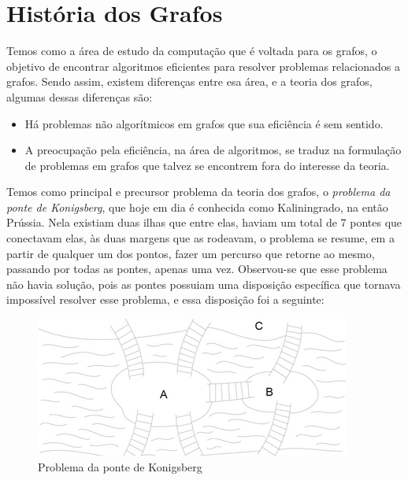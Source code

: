 \documentclass[12pt a4paper]{paper}
\title{\center{Teoria dos Grafos}}
\author{João Vitor Rezende Moura}
\date{2023-10-29}
\begin{document}
\maketitle
\begin{abstract}
Algoritmos e Grafos são de suma importância dentro do campo computacional devido à importância do seu uso, tanto no campo teórico, como no prático. Devido o seu foco computacional, a eficiência de tempo e espaço dos processos são fundamentais devido à sua aplicação posterior dentro da computação.
É de importância, o estudo de tópicos tanto básicos, como técnicas elementares, busca em grafo, otimização combinatória, como tópicos mais avançados, como estudo de complexidade, e estudo do problema de fluxo máximo.
Com isso, a resolução de exercícios também é de suma importância, e será apresentado.
\end{abstract}

\section{História dos Grafos}
Temos como a área de estudo da computação que é voltada para os grafos, o objetivo de encontrar algoritmos eficientes para resolver problemas relacionados a grafos. Sendo assim, existem diferenças entre esa área, e a teoria dos grafos, algumas dessas diferenças são:

\begin{itemize}
  \item Há problemas não algorítmicos em grafos que sua eficiência é sem sentido.
  \item A preocupação pela eficiência, na área de algoritmos, se traduz na formulação de problemas em grafos que talvez se encontrem fora do interesse da teoria.
\end{itemize}
Temos como principal e precursor problema da teoria dos grafos, o \textit{problema da ponte de Konigsberg}, que hoje em dia é conhecida como Kaliningrado, na então Prússia. Nela existiam duas ilhas que entre elas, haviam um total de 7 pontes que conectavam elas, às duas margens que as rodeavam, o problema se resume, em a partir de qualquer um dos pontos, fazer um percurso que retorne ao mesmo, passando por todas as pontes, apenas uma vez. 
Observou-se que esse problema não havia solução, pois as pontes possuiam uma disposição específica que tornava impossível resolver esse problema, e essa disposição foi a seguinte:

\begin{figure}[H]
\centering
\includegraphics[scale=0.8]{Konigsberg}
\caption{Problema da ponte de Konigsberg}
\end{figure}
\end{document}
